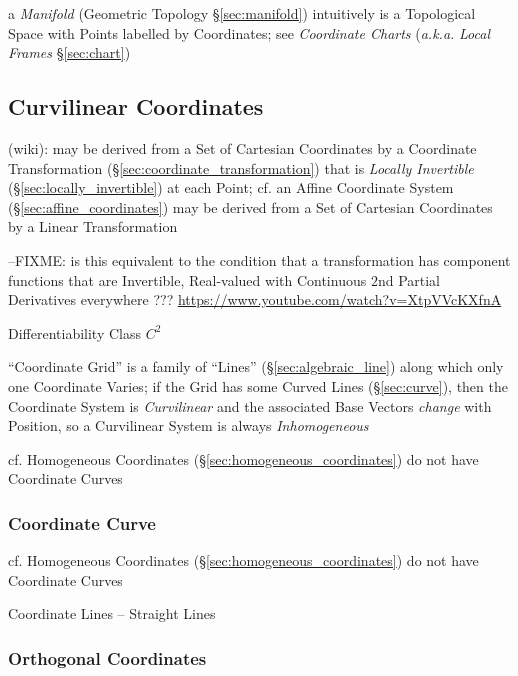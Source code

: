 \fist a \emph{Manifold} (Geometric Topology \S\ref{sec:manifold}) intuitively is
a Topological Space with Points labelled by Coordinates; see \emph{Coordinate
  Charts} (\emph{a.k.a.} \emph{Local Frames} \S\ref{sec:chart})



\subsection{Curvilinear Coordinates}\label{sec:curvilinear_coordinates}

(wiki): may be derived from a Set of Cartesian Coordinates by a Coordinate
Transformation (\S\ref{sec:coordinate_transformation}) that is \emph{Locally
  Invertible} (\S\ref{sec:locally_invertible}) at each Point; cf. an Affine
Coordinate System (\S\ref{sec:affine_coordinates}) may be derived from a Set of
Cartesian Coordinates by a Linear Transformation

--FIXME: is this equivalent to the condition that a transformation has component
functions that are Invertible, Real-valued with Continuous $2$nd Partial
Derivatives everywhere ??? \url{https://www.youtube.com/watch?v=XtpVVcKXfnA}

Differentiability Class $C^2$

``Coordinate Grid'' is a family of ``Lines'' (\S\ref{sec:algebraic_line}) along
which only one Coordinate Varies; if the Grid has some Curved Lines
(\S\ref{sec:curve}), then the Coordinate System is \emph{Curvilinear} and the
associated Base Vectors \emph{change} with Position, so a Curvilinear System is
always \emph{Inhomogeneous}

cf. Homogeneous Coordinates (\S\ref{sec:homogeneous_coordinates}) do not have
Coordinate Curves



\subsubsection{Coordinate Curve}\label{sec:coordinate_curve}

cf. Homogeneous Coordinates (\S\ref{sec:homogeneous_coordinates}) do not have
Coordinate Curves

Coordinate Lines -- Straight Lines



\subsubsection{Orthogonal Coordinates}\label{sec:orthogonal_coordinates}

